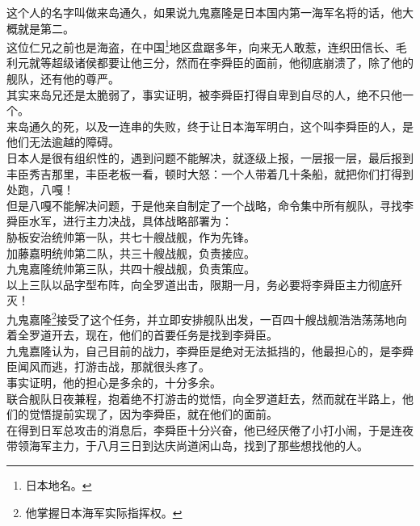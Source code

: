 \begin{multicols}{\theparacolNo}
这个人的名字叫做来岛通久，如果说九鬼嘉隆是日本国内第一海军名将的话，他大概就是第二。\\

这位仁兄之前也是海盗，在中国\footnote{日本地名。}地区盘踞多年，向来无人敢惹，连织田信长、毛利元就等超级诸侯都要让他三分，然而在李舜臣的面前，他彻底崩溃了，除了他的舰队，还有他的尊严。\\

其实来岛兄还是太脆弱了，事实证明，被李舜臣打得自卑到自尽的人，绝不只他一个。\\

来岛通久的死，以及一连串的失败，终于让日本海军明白，这个叫李舜臣的人，是他们无法逾越的障碍。\\

日本人是很有组织性的，遇到问题不能解决，就逐级上报，一层报一层，最后报到丰臣秀吉那里，丰臣老板一看，顿时大怒：一个人带着几十条船，就把你们打得到处跑，八嘎！\\

但是八嘎不能解决问题，于是他亲自制定了一个战略，命令集中所有舰队，寻找李舜臣水军，进行主力决战，具体战略部署为：\\

胁板安治统帅第一队，共七十艘战舰，作为先锋。\\

加藤嘉明统帅第二队，共三十艘战舰，负责接应。\\

九鬼嘉隆统帅第三队，共四十艘战舰，负责策应。\\

以上三队以品字型布阵，向全罗道出击，限期一月，务必要将李舜臣主力彻底歼灭！\\

九鬼嘉隆\footnote{他掌握日本海军实际指挥权。}接受了这个任务，并立即安排舰队出发，一百四十艘战舰浩浩荡荡地向着全罗道开去，现在，他们的首要任务是找到李舜臣。\\

九鬼嘉隆认为，自己目前的战力，李舜臣是绝对无法抵挡的，他最担心的，是李舜臣闻风而逃，打游击战，那就很头疼了。\\

事实证明，他的担心是多余的，十分多余。\\

联合舰队日夜兼程，抱着绝不打游击的觉悟，向全罗道赶去，然而就在半路上，他们的觉悟提前实现了，因为李舜臣，就在他们的面前。\\

在得到日军总攻击的消息后，李舜臣十分兴奋，他已经厌倦了小打小闹，于是连夜带领海军主力，于八月三日到达庆尚道闲山岛，找到了那些想找他的人。\\


\end{multicols}
